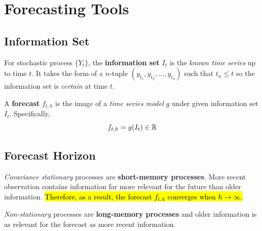 \documentclass[11pt]{article}
\begin{document}
	\section{Forecasting Tools}
	\subsection{Information Set}
		\begin{definition}
			For stochastic process $\{Y_t\}$, the \textbf{information set} $I_t$ is the \emph{known time series} up to time $t$. It takes the form of a $n$-tuple $(y_{t_1}, y_{t_2}, \dots, y_{t_n})$ such that $t_n \leq t$ so the information set is \emph{certain} at time $t$.
		\end{definition}
		
		\begin{definition}
			A \textbf{forecast} $f_{t, h}$ is the image of a \emph{time series model} $g$ under given information set $I_t$. Specifically,
			\begin{equation}
				f_{t, h} = g(I_t) \in \mathbb{R}
			\end{equation}
		\end{definition}
	\subsection{Forecast Horizon}
		\begin{remark}
			\emph{Covariance stationary} processes are \textbf{short-memory processes}. More recent observation contains information far more relevant for the future than older information. \hl{Therefore, as a result, the forecast $f_{t, h}$ converges when $h \to \infty$.}
		\end{remark}
		
		\begin{remark}
			\emph{Non-stationary} processes are \textbf{long-memory processes} and older information is as relevant for the forecast as more recent information.
		\end{remark}
\end{document}

